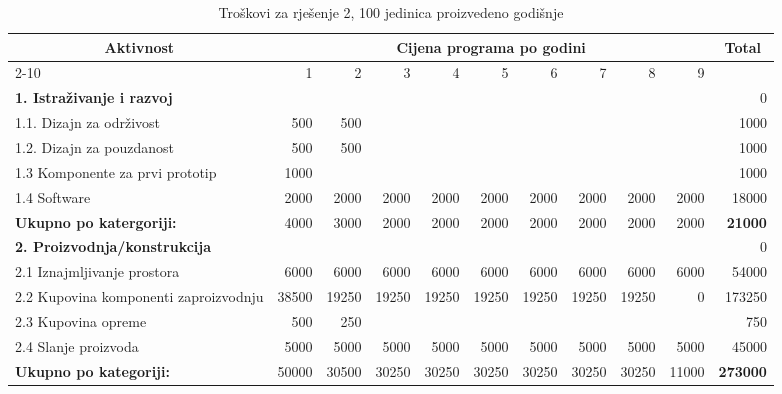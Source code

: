 \documentclass[12pt]{article}
\begin{document}
\begin{landscape}
\begin{table}[htbp]
  \centering
  \small
  \caption{Troškovi za rješenje 2, 100 jedinica proizvedeno godišnje}
    \begin{tabular}{lrrrrrrrrrr}
    \toprule
    \multicolumn{1}{c}{\multirow{2}[4]{*}{Aktivnost}} & \multicolumn{9}{c}{Cijena programa po godini}                         & \multicolumn{1}{c}{\multirow{2}[4]{*}{Total}} \\
\cmidrule{2-10}          & 1     & 2     & 3     & 4     & 5     & 6     & 7     & 8     & 9     &  \\
    \midrule
    \textbf{1. Istraživanje i razvoj} &       &       &       &       &       &       &       &       &       & 0 \\
    1.1. Dizajn za održivost & 500   & 500   &       &       &       &       &       &       &       & 1000 \\
    1.2. Dizajn za pouzdanost & 500   & 500   &       &       &       &       &       &       &       & 1000 \\
    1.3 Komponente za prvi prototip & 1000  &       &       &       &       &       &       &       &       & 1000 \\
    1.4 Software & 2000  & 2000  & 2000  & 2000  & 2000  & 2000  & 2000  & 2000  & 2000  & 18000 \\
    \midrule
    \textbf{Ukupno po katergoriji:} & 4000  & 3000  & 2000  & 2000  & 2000  & 2000  & 2000  & 2000  & 2000  & \textbf{21000} \\
    \midrule
    \textbf{2. Proizvodnja/konstrukcija} &       &       &       &       &       &       &       &       &       & 0 \\
    2.1 Iznajmljivanje prostora & 6000  & 6000  & 6000  & 6000  & 6000  & 6000  & 6000  & 6000  & 6000  & 54000 \\
    \multicolumn{1}{p{14.715em}}{2.2 Kupovina komponenti za\newline{}proizvodnju} & 38500 & 19250 & 19250 & 19250 & 19250 & 19250 & 19250 & 19250 & 0     & 173250 \\
    2.3 Kupovina opreme & 500   & 250   &       &       &       &       &       &       &       & 750 \\
    2.4 Slanje proizvoda & 5000  & 5000  & 5000  & 5000  & 5000  & 5000  & 5000  & 5000  & 5000  & 45000 \\
    \midrule
    \textbf{Ukupno po kategoriji:} & 50000 & 30500 & 30250 & 30250 & 30250 & 30250 & 30250 & 30250 & 11000 & \textbf{273000} \\

\end{tabular}
\end{table}
\end{landscape}
\end{document}
